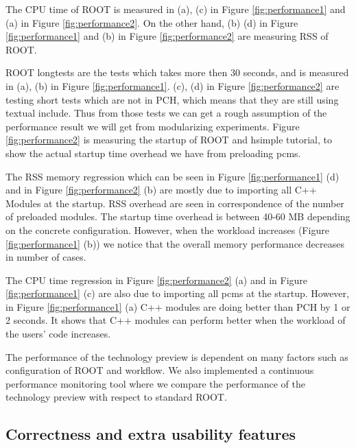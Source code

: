 \documentclass{webofc}
\begin{document}
The CPU time of ROOT is measured in (a), (c) in Figure \ref{fig:performance1} and (a) in Figure \ref{fig:performance2}. On the other hand, (b) (d) in Figure \ref{fig:performance1} and (b) in Figure \ref{fig:performance2} are measuring RSS of ROOT.

ROOT longtests are the tests which takes more then 30 seconds, and is measured in (a), (b) in Figure \ref{fig:performance1}. (c), (d) in Figure \ref{fig:performance2} are testing short tests which are not in PCH, which means that they are still using textual include. Thus from those tests we can get a rough assumption of the performance result we will get from modularizing experiments. Figure \ref{fig:performance2} is measuring the startup of ROOT and hsimple tutorial, to show the actual startup time overhead we have from preloading pcms.

The RSS memory regression which can be seen in Figure \ref{fig:performance1} (d) and in Figure \ref{fig:performance2} (b) are mostly due to importing all C++ Modules at the startup. RSS overhead are seen in correspondence of the number of preloaded modules. The startup time overhead is between 40-60 MB depending on the concrete configuration. However, when the workload increases (Figure \ref{fig:performance1} (b)) we notice that the overall memory performance decreases in number of cases.

The CPU time regression in Figure \ref{fig:performance2} (a) and in Figure \ref{fig:performance1} (c) are also due to importing all pcms at the startup. However, in Figure \ref{fig:performance1} (a) C++ modules are doing better than PCH by 1 or 2 seconds. It shows that C++ modules can perform better when the workload of the users' code increases.

The performance of the technology preview is dependent on many factors such as configuration of ROOT and workflow. We also implemented a continuous performance monitoring tool \cite{rootbench} where we compare the performance of the technology preview with respect to standard ROOT.

\subsection{Correctness and extra usability features}
\label{correctness}
\end{document}
